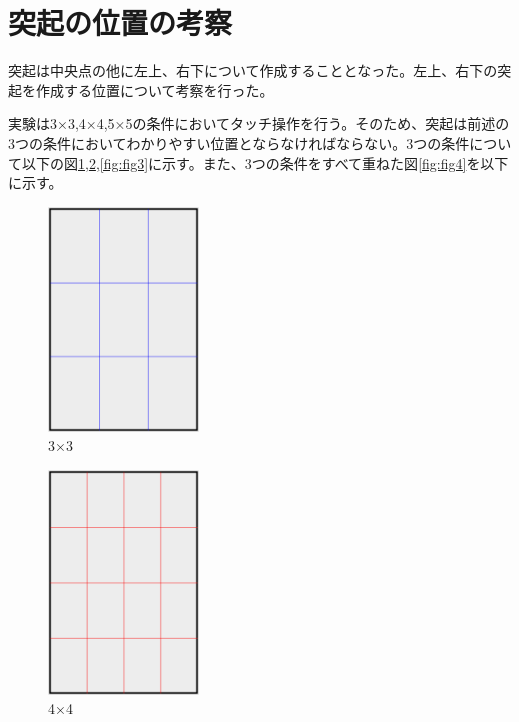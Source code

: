 \documentclass[11pt,a4paper]{jarticle}
\begin{document}
\section{突起の位置の考察}
突起は中央点の他に左上、右下について作成することとなった。左上、右下の突起を作成する位置について考察を行った。


実験は3×3,4×4,5×5の条件においてタッチ操作を行う。そのため、突起は前述の3つの条件においてわかりやすい位置とならなければならない。3つの条件について以下の図\ref{fig:fig1},\ref{fig:fig2},\ref{fig:fig3}に示す。また、3つの条件をすべて重ねた図\ref{fig:fig4}を以下に示す。

\begin{figure}[H]
  \begin{center}
  \includegraphics[width=4cm]{fig/photo1.eps}
  \caption{3×3}
  \label{fig:fig1}
  \end{center}
\end{figure}

\begin{figure}[H]
  \begin{center}
  \includegraphics[width=4cm]{fig/photo2.eps}
  \caption{4×4}
  \label{fig:fig2}
  \end{center}
\end{figure}
\end{document}
